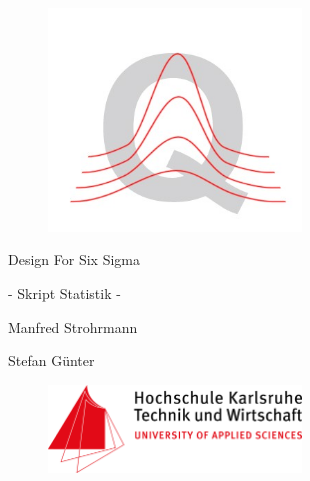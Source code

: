 \begin{figure}[H]
  \centerline{\includegraphics[width=0.6\textwidth]{awel.jpg}}
\end{figure}

\noindent \bigskip

\centerline  {\fontsize{50}{60}\selectfont Design For Six Sigma} 

\noindent \medskip

\centerline  {\fontsize{23}{30}\selectfont  - Skript Statistik -}

\noindent \bigskip
\noindent \bigskip

\centerline  {\fontsize{23}{30}\selectfont  Manfred Strohrmann}\medskip

\noindent 

\centerline  {\fontsize{23}{30}\selectfont Stefan Günter}

\vspace{6.0\baselineskip}

\begin{figure}[H]
  \centerline{\includegraphics[width=0.6\textwidth]{FH_Logo.png}}
\end{figure}

\clearpage


\noindent 
